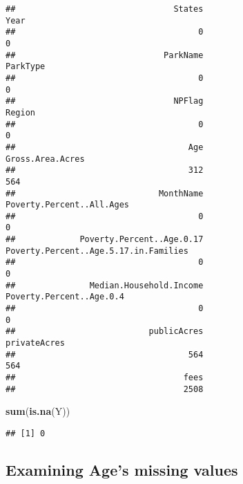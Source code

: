 \documentclass[
]{article}
\newenvironment{Shaded}{\begin{snugshade}}{\end{snugshade}}
\newcommand{\KeywordTok}[1]{\textcolor[rgb]{0.13,0.29,0.53}{\textbf{#1}}}
\newcommand{\NormalTok}[1]{#1}
\newcommand{\OperatorTok}[1]{\textcolor[rgb]{0.81,0.36,0.00}{\textbf{#1}}}
\newcommand{\StringTok}[1]{\textcolor[rgb]{0.31,0.60,0.02}{#1}}
\begin{document}
\begin{verbatim}
##                                States                                  Year 
##                                     0                                     0 
##                              ParkName                              ParkType 
##                                     0                                     0 
##                                NPFlag                                Region 
##                                     0                                     0 
##                                   Age                      Gross.Area.Acres 
##                                   312                                   564 
##                             MonthName             Poverty.Percent..All.Ages 
##                                     0                                     0 
##             Poverty.Percent..Age.0.17 Poverty.Percent..Age.5.17.in.Families 
##                                     0                                     0 
##               Median.Household.Income              Poverty.Percent..Age.0.4 
##                                     0                                     0 
##                           publicAcres                          privateAcres 
##                                   564                                   564 
##                                  fees 
##                                  2508
\end{verbatim}

\begin{Shaded}
\begin{Highlighting}[]
\KeywordTok{sum}\NormalTok{(}\KeywordTok{is.na}\NormalTok{(Y))}
\end{Highlighting}
\end{Shaded}

\begin{verbatim}
## [1] 0
\end{verbatim}

\hypertarget{examining-ages-missing-values}{%
\subsection{Examining Age's missing
values}\label{examining-ages-missing-values}}

\begin{Shaded}
\end{Shaded}
\end{document}
